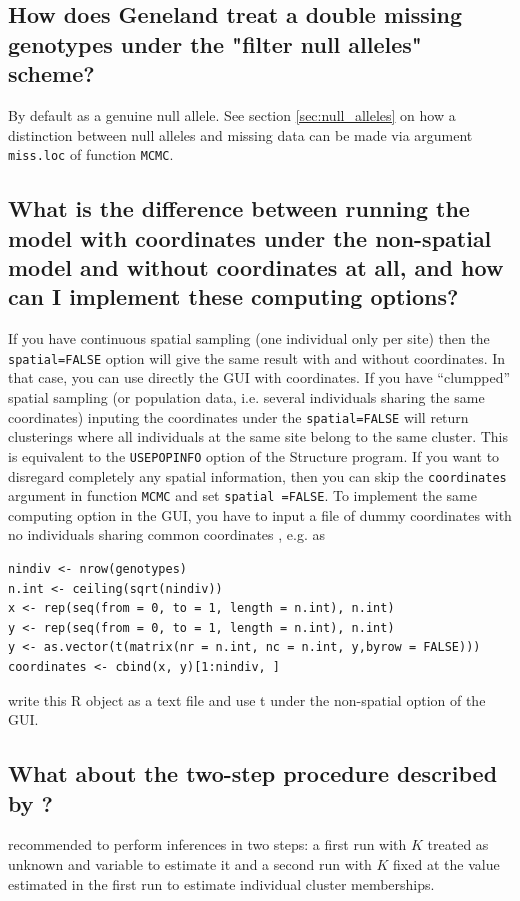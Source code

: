 \documentclass[a4paper,10pt]{article}
\begin{document}
\subsection[Null alleles]{How does {\sc Geneland} treat a double missing genotypes under the "filter null alleles" scheme?}
By default as a genuine null allele. 
See section \ref{sec:null_alleles} on how a distinction between null alleles and missing data can be made 
via argument \texttt{miss.loc} of function \texttt{MCMC}. 

\subsection[Non spatial model with coordiantes]{What is the difference between running the model with 
coordinates under the non-spatial 
model and without coordinates at all, and how can I implement these computing options?}


If you have continuous spatial sampling (one individual only per site)
then the {\tt spatial=FALSE} option will give the same result with and without coordinates.
In that case, you can use directly the GUI with coordinates.
If you have ``clumpped'' spatial sampling (or population data, i.e. several individuals sharing the same coordinates) 
inputing the coordinates under  the {\tt spatial=FALSE} will return clusterings where
all individuals at the same site belong to the same cluster. This is equivalent to the {\tt USEPOPINFO} option of the 
{\sc Structure} program. If you want to disregard completely any spatial information, then  you can skip the 
{\tt coordinates} argument in function {\tt MCMC} and set
 {\tt spatial =FALSE}. To implement the same computing option in the GUI, you have to input a file of dummy coordinates 
with no individuals sharing common coordinates , e.g. as 
\begin{verbatim}
nindiv <- nrow(genotypes)
n.int <- ceiling(sqrt(nindiv))
x <- rep(seq(from = 0, to = 1, length = n.int), n.int)
y <- rep(seq(from = 0, to = 1, length = n.int), n.int)
y <- as.vector(t(matrix(nr = n.int, nc = n.int, y,byrow = FALSE)))
coordinates <- cbind(x, y)[1:nindiv, ]
\end{verbatim}



write this R object as a text file and use t under the non-spatial option of the GUI.

\subsection[One run only to estimate $K$]{What about the two-step procedure described by \citet{Guillot05a}?}
\citet{Guillot05a} recommended to perform inferences in two steps: a first run with $K$ treated as unknown and variable 
to estimate it and a second run with $K$ fixed at the value estimated in the first run to estimate individual cluster memberships. 
\end{document}
